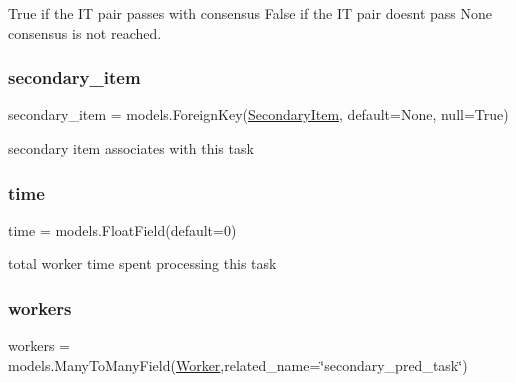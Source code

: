 True if the IT pair passes with consensus False if the IT pair doesn\textquotesingle{}t pass None consensus is not reached. 

\mbox{\label{classjoinapp_1_1models_1_1task__management__models_1_1_sec_pred_task_a0a9178a9cf48b964cab2025b9788a615}} 
\subsubsection{\texorpdfstring{secondary\_item}{secondary\_item}}
{\footnotesize\ttfamily secondary\+\_\+item = models.\+Foreign\+Key(\textquotesingle{}\mbox{\hyperlink{classjoinapp_1_1models_1_1items_1_1_secondary_item}{Secondary\+Item}}\textquotesingle{}, default=None, null=True)\hspace{0.3cm}{\ttfamily [static]}}



secondary item associates with this task 

\mbox{\label{classjoinapp_1_1models_1_1task__management__models_1_1_sec_pred_task_a70c092a6aebace0b1ea406e14da78a40}} 
\subsubsection{\texorpdfstring{time}{time}}
{\footnotesize\ttfamily time = models.\+Float\+Field(default=0)\hspace{0.3cm}{\ttfamily [static]}}



total worker time spent processing this task 

\mbox{\label{classjoinapp_1_1models_1_1task__management__models_1_1_sec_pred_task_a42a0cd7f4a34b940f08fd182458c9aba}} 
\subsubsection{\texorpdfstring{workers}{workers}}
{\footnotesize\ttfamily workers = models.\+Many\+To\+Many\+Field(\mbox{\hyperlink{classjoinapp_1_1models_1_1task__management__models_1_1_worker}{Worker}},related\+\_\+name=\char`\"{}secondary\+\_\+pred\+\_\+task\char`\"{})\hspace{0.3cm}{\ttfamily [static]}}




